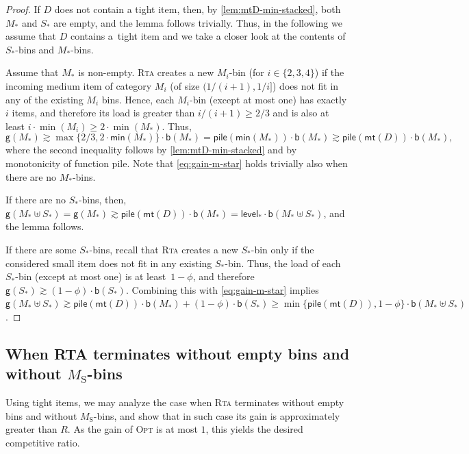 \documentclass[a4paper,USenglish,cleveref]{lipics-v2019}
\newcommand{\R}{\ensuremath{R}}
\newcommand{\M}{\ensuremath{M_\mathrm{S}}\xspace}
\newcommand{\ST}{\ensuremath{S_*}\xspace}
\newcommand{\MT}{\ensuremath{M_*}\xspace}
\newcommand{\MTI}[1]{\ensuremath{M_{#1}\xspace}}
\newcommand{\D}{\ensuremath{D}\xspace}
\newcommand{\smallBoundary}{\ensuremath{\phi}}
\newcommand{\B}{\textsf{b}}
\newcommand{\gain}{\textsf{g}}
\newcommand{\stack}{\textsf{pile}}
\newcommand{\level}{\textsf{level}_*}
\newcommand{\mn}{\textsf{min}}
\newcommand{\mt}{\textsf{mt}(\D)}
\newcommand{\ALG}{\textsc{Rta}\xspace}
\newcommand{\OPT}{\textsc{Opt}\xspace}
\begin{document}
\begin{proof}
If \D does not contain a tight item, then, by \cref{lem:mtD-min-stacked}, both
\MT and \ST are empty, and the lemma follows trivially. Thus, in the
following we assume that \D contains a~tight item and we take a closer look at
the contents of \ST-bins and \MT-bins.

Assume that \MT is non-empty. \ALG creates a new $\MTI{i}$-bin (for $i \in \{2,3,4\}$) 
if the incoming medium item of category $\MTI{i}$ (of size $(1/(i+1),1/i]$) 
does not fit in any of the existing $\MTI{i}$ bins. 
Hence, each $\MTI{i}$-bin (except at most one) has exactly $i$ items, and therefore its
load is greater than $i/(i+1) \geq 2/3$ and is also at least $i \cdot \min(\MTI{i}) 
\geq 2 \cdot \min(\MT)$. Thus, 
\begin{equation}
\label{eq:gain-m-star}
  \gain(\MT) 
  \gtrsim \max \{2/3, 2 \cdot \mn(\MT) \} \cdot \B(\MT) = 
  \stack(\mn(\MT)) \cdot \B(\MT) \gtrsim \stack(\mt) \cdot \B(\MT),
\end{equation}
where the second inequality follows by \cref{lem:mtD-min-stacked} and by
monotonicity of function \stack. Note that \eqref{eq:gain-m-star} holds
trivially also when there are no \MT-bins.

If there are no \ST-bins, then, $\gain(\MT \uplus \ST) = 
\gain(\MT) \gtrsim \stack(\mt) \cdot \B(\MT) = \level \cdot \B(\MT \uplus \ST)$,
and the lemma follows. 

If there are some \ST-bins, recall that \ALG creates a new \ST-bin only if
the considered small item does not fit in any existing \ST-bin. Thus, the load
of each \ST-bin (except at most one) is at least~$1-\smallBoundary$, and
therefore $\gain(\ST) \gtrsim (1-\smallBoundary)\cdot \B(\ST)$. Combining this
with \eqref{eq:gain-m-star} implies $\gain(\MT \uplus \ST) \gtrsim \stack(\mt)
\cdot \B(\MT) + (1-\smallBoundary)\cdot \B(\ST) \geq \min \{\stack(\mt),
1-\smallBoundary \} \cdot \B(\MT \uplus \ST)$.
\end{proof}



\subsection{When RTA terminates without empty bins and without \texorpdfstring{\M-bins}{MS-bins}}
\label{sec:no-m-bin}

Using tight items, we may analyze the case when \ALG terminates without empty
bins and without $\M$-bins, and show that in such case its gain is approximately
greater than $\R$. As the gain of \OPT is at most $1$, this yields the desired
competitive ratio. 
\end{document}

